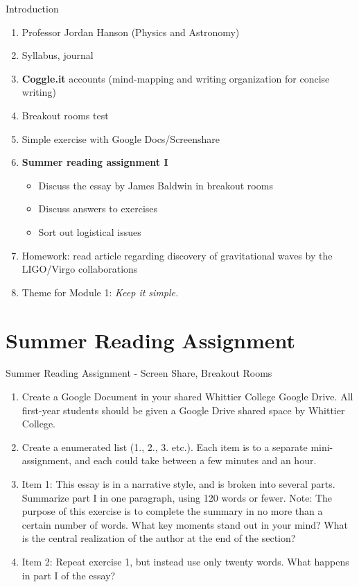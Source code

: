 \documentclass{beamer}
\begin{document}
\begin{frame}{Introduction}
\begin{enumerate}
\item Professor Jordan Hanson (Physics and Astronomy)
\item Syllabus, journal
\item \alert{\textbf{Coggle.it}} accounts (mind-mapping and writing organization for concise writing)
\item Breakout rooms test
\item Simple exercise with Google Docs/Screenshare
\item \textbf{Summer reading assignment I}
\begin{itemize}
\item Discuss the essay by James Baldwin in breakout rooms
\item Discuss answers to exercises
\item Sort out logistical issues
\end{itemize}
\item Homework: read article regarding discovery of gravitational waves by the LIGO/Virgo collaborations
\item \alert{Theme for Module 1:} \textit{Keep it simple.}
\end{enumerate}
\end{frame}

\section{Summer Reading Assignment}

\begin{frame}{Summer Reading Assignment - Screen Share, Breakout Rooms}
\small
\begin{enumerate}
\item Create a Google Document in your shared Whittier College Google Drive. All first-year students should be
given a Google Drive shared space by Whittier College.
\item Create a enumerated list (1., 2., 3. etc.). Each item is to a separate mini-assignment, and each could take
between a few minutes and an hour.
\item Item 1: This essay is in a narrative style, and is broken into several parts. Summarize part I in one paragraph, using 120 words or fewer. Note: The purpose of this exercise is to complete the summary in no more than a
certain number of words. What key moments stand out in your mind? What is the central realization of the
author at the end of the section?
\item Item 2: Repeat exercise 1, but instead use only twenty words. What happens in part I of the essay?
\end{enumerate}
\end{frame}
\end{document}
